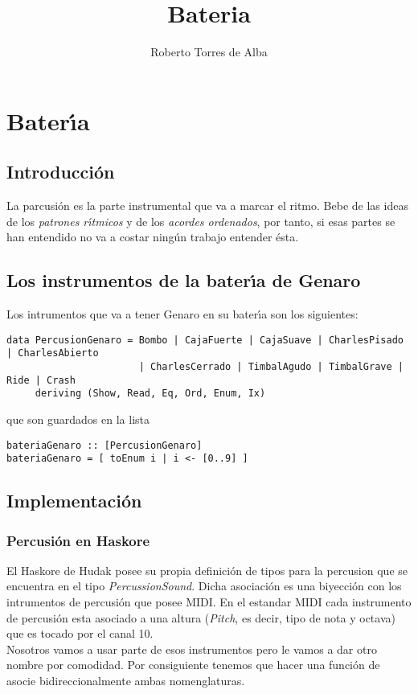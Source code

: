 \documentclass[a4paper]{report}
\title{Bateria}
\author{Roberto Torres de Alba}
\begin{document}
\tableofcontents

\chapter{Bater\'\i a}

\section{Introducci\'on}
La parcusi\'on es la parte instrumental que va a marcar el ritmo. Bebe de las ideas
de los \emph{patrones r\'\i tmicos} y de los \emph{acordes ordenados}, por tanto, si esas partes
se han entendido no va a costar ning\'un trabajo entender \'esta.

\section{Los instrumentos de la bater\'\i a de Genaro}
Los intrumentos que va a tener Genaro en su bater\'\i a son los siguientes:
\small
\begin{verbatim}
data PercusionGenaro = Bombo | CajaFuerte | CajaSuave | CharlesPisado | CharlesAbierto
                       | CharlesCerrado | TimbalAgudo | TimbalGrave | Ride | Crash
     deriving (Show, Read, Eq, Ord, Enum, Ix)
\end{verbatim}
\normalsize
que son guardados en la lista
\small
\begin{verbatim}
bateriaGenaro :: [PercusionGenaro]
bateriaGenaro = [ toEnum i | i <- [0..9] ]
\end{verbatim}
\normalsize

\section{Implementaci\'on}

\subsection{Percusi\'on en Haskore}
El Haskore de Hudak posee su propia definici\'on de tipos para la percusion que
se encuentra en el tipo \emph{PercussionSound}. Dicha asociaci\'on es una biyecci\'on
con los intrumentos de percusi\'on que posee MIDI. En el estandar MIDI cada
instrumento de percusi\'on esta asociado a una altura (\emph{Pitch}, es decir, tipo de nota y octava)
que es tocado por el canal 10.\\
\indent Nosotros vamos a usar parte de esos instrumentos pero le vamos a dar otro nombre por
comodidad. Por consiguiente tenemos que hacer una funci\'on de asocie bidireccionalmente
ambas nomenglaturas.
\end{document}
